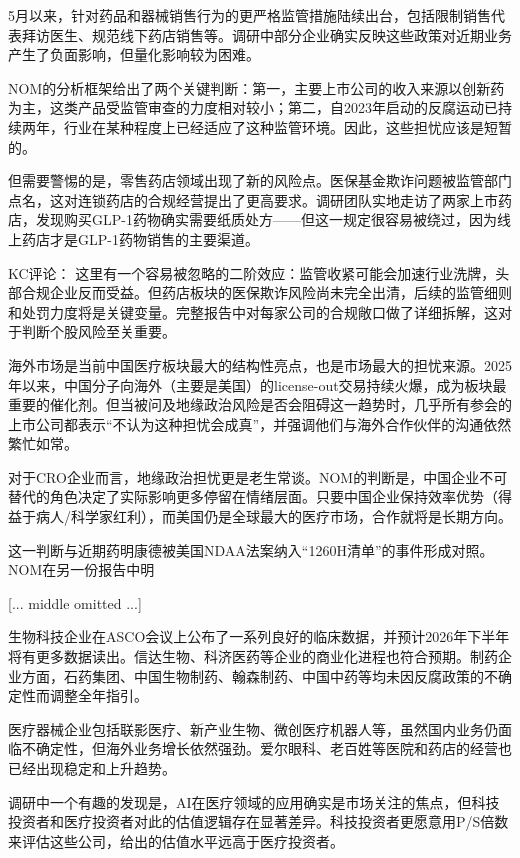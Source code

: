 \documentclass[11pt]{ctexart}
\begin{document}
5月以来，针对药品和器械销售行为的更严格监管措施陆续出台，包括限制销售代表拜访医生、规范线下药店销售等。调研中部分企业确实反映这些政策对近期业务产生了负面影响，但量化影响较为困难。

NOM的分析框架给出了两个关键判断：第一，主要上市公司的收入来源以创新药为主，这类产品受监管审查的力度相对较小；第二，自2023年启动的反腐运动已持续两年，行业在某种程度上已经适应了这种监管环境。因此，这些担忧应该是短暂的。

但需要警惕的是，零售药店领域出现了新的风险点。医保基金欺诈问题被监管部门点名，这对连锁药店的合规经营提出了更高要求。调研团队实地走访了两家上市药店，发现购买GLP-1药物确实需要纸质处方——但这一规定很容易被绕过，因为线上药店才是GLP-1药物销售的主要渠道。

KC评论： 这里有一个容易被忽略的二阶效应：监管收紧可能会加速行业洗牌，头部合规企业反而受益。但药店板块的医保欺诈风险尚未完全出清，后续的监管细则和处罚力度将是关键变量。完整报告中对每家公司的合规敞口做了详细拆解，这对于判断个股风险至关重要。

海外市场是当前中国医疗板块最大的结构性亮点，也是市场最大的担忧来源。2025年以来，中国分子向海外（主要是美国）的license-out交易持续火爆，成为板块最重要的催化剂。但当被问及地缘政治风险是否会阻碍这一趋势时，几乎所有参会的上市公司都表示“不认为这种担忧会成真”，并强调他们与海外合作伙伴的沟通依然繁忙如常。

对于CRO企业而言，地缘政治担忧更是老生常谈。NOM的判断是，中国企业不可替代的角色决定了实际影响更多停留在情绪层面。只要中国企业保持效率优势（得益于病人/科学家红利），而美国仍是全球最大的医疗市场，合作就将是长期方向。

这一判断与近期药明康德被美国NDAA法案纳入“1260H清单”的事件形成对照。NOM在另一份报告中明

[... middle omitted ...]



生物科技企业在ASCO会议上公布了一系列良好的临床数据，并预计2026年下半年将有更多数据读出。信达生物、科济医药等企业的商业化进程也符合预期。制药企业方面，石药集团、中国生物制药、翰森制药、中国中药等均未因反腐政策的不确定性而调整全年指引。

医疗器械企业包括联影医疗、新产业生物、微创医疗机器人等，虽然国内业务仍面临不确定性，但海外业务增长依然强劲。爱尔眼科、老百姓等医院和药店的经营也已经出现稳定和上升趋势。

调研中一个有趣的发现是，AI在医疗领域的应用确实是市场关注的焦点，但科技投资者和医疗投资者对此的估值逻辑存在显著差异。科技投资者更愿意用P/S倍数来评估这些公司，给出的估值水平远高于医疗投资者。
\end{document}

